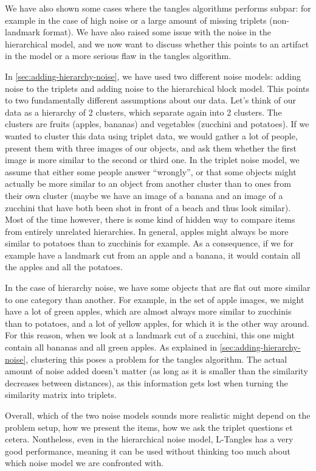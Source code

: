 We have also shown some cases where the tangles algorithms performs subpar: for example in the case of high noise or a large amount of missing triplets (non-landmark format).
We have also raised some issue with the noise in the hierarchical model, and we now want to discuss whether this points to an artifact in the model or a more serious flaw in the tangles
algorithm.

In \autoref{sec:adding-hierarchy-noise}, we have used two different noise models: adding noise to the triplets and adding noise to the hierarchical block model. This points to two fundamentally different
assumptions about our data. Let's think of our data as a hierarchy of 2 clusters, which separate again into 2 clusters. The clusters are fruits (apples, bananas) and vegetables (zucchini and potatoes).
If we wanted to cluster this data using triplet data, we would gather a lot of people, present them with three images of our objects, and ask them whether the first image is more similar to the second or third one.
In the triplet noise model, we assume that either some people answer \enquote{wrongly}, or that some objects might actually be more similar to an object from another cluster than to ones
from their own cluster (maybe we have an image of a banana and an image of a zucchini that have both been shot in front of a beach and thus look similar). Most of the time however, there is some kind of 
hidden way to compare items from entirely unrelated hierarchies. In general, apples might always be more similar to potatoes than to zucchinis for example. As a consequence, if we for example have a landmark
cut from an apple and a banana, it would contain all the apples and all the potatoes. 

In the case of hierarchy noise, we have some objects that are flat out more similar to one category than another. For example, in the set of apple images, we might have a lot of green apples, which 
are almost always more similar to zucchinis than to potatoes, and a lot of yellow apples, for which it is the other way around. For this reason, when we look at a landmark cut of a zucchini, this one
might contain all bananas and all green apples. As explained in \autoref{sec:adding-hierarchy-noise}, clustering this poses a problem for the tangles algorithm. The actual amount of noise added doesn't matter
(as long as it is smaller than the similarity decreases between distances),  as this information gets lost when turning the similarity matrix into triplets.

Overall, which of the two noise models sounds more realistic might depend on the problem setup, how we present the items, how we ask the triplet questions et cetera. Nontheless, even in the
hierarchical noise model, L-Tangles has a very good performance, meaning it can be used without thinking too much about which noise model we are confronted with.

